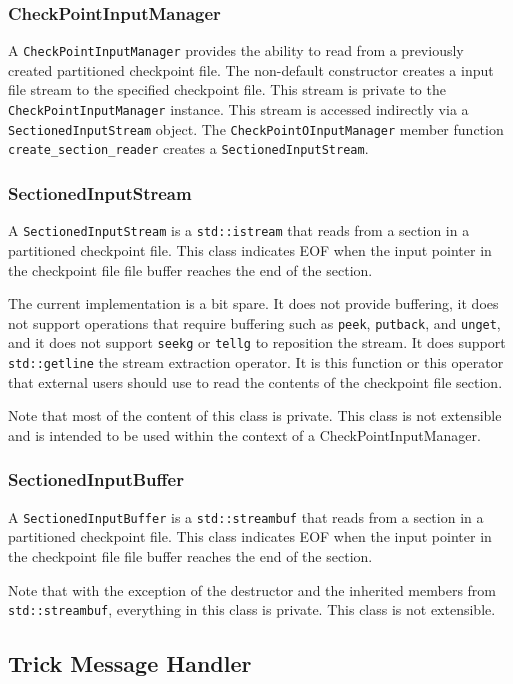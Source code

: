 \subsubsection{CheckPointInputManager}
A \verb|CheckPointInputManager| provides the ability to read from a
previously created partitioned checkpoint file.
The non-default constructor creates a \Cplusplus input file stream to the
specified checkpoint file.
This stream is private to the \verb|CheckPointInputManager| instance.
This stream is accessed indirectly via a \verb|SectionedInputStream|
object.
The \verb|CheckPointOInputManager| member function \verb|create_section_reader|
creates a \verb|SectionedInputStream|.


\subsubsection{SectionedInputStream}
A \verb|SectionedInputStream| is a \verb|std::istream| that reads from a
section in a partitioned checkpoint file. This class indicates EOF when the
input pointer in the checkpoint file file buffer reaches the end of the section.

The current implementation is a bit spare.
It does not provide buffering,
it does not support operations that require buffering
such as \verb|peek|, \verb|putback|, and \verb|unget|,
and it does not support \verb|seekg| or \verb|tellg|
to reposition the stream.
It does support \verb|std::getline| the stream extraction operator.
It is this function or this operator that external users should use to
read the contents of the checkpoint file section.

Note that most of the content of this class is private.
This class is not extensible and is intended to be used within the
context of a CheckPointInputManager.

\subsubsection{SectionedInputBuffer}
A \verb|SectionedInputBuffer| is a \verb|std::streambuf| that reads from a
section in a partitioned checkpoint file. This class indicates EOF when the
input pointer in the checkpoint file file buffer reaches the end of the section.

Note that with the exception of the destructor and the inherited members
from \verb|std::streambuf|, everything in this class is private.
This class is not extensible.

\subsection{Trick Message Handler}
